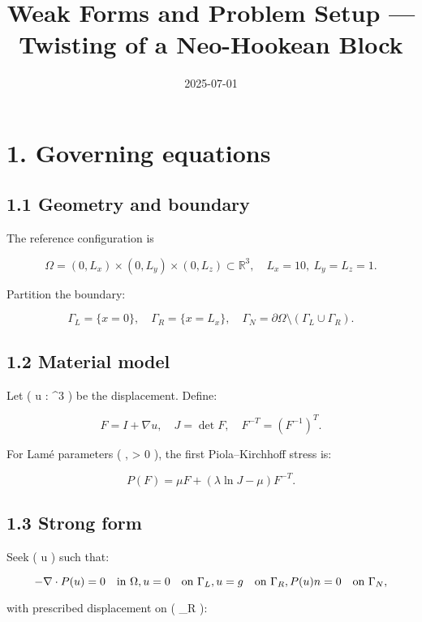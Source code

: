 \documentclass[
  letterpaper,
  DIV=11,
  numbers=noendperiod]{scrartcl}
\title{Weak Forms and Problem Setup --- Twisting of a Neo-Hookean Block}
\author{}
\date{2025-07-01}
\begin{document}
\maketitle


\section{1. Governing equations}\label{governing-equations}

\subsection{1.1 Geometry and boundary}\label{geometry-and-boundary}

The reference configuration is

\[
\Omega = (0, L_x) \times (0, L_y) \times (0, L_z) \subset \mathbb{R}^3, \quad L_x = 10,\ L_y = L_z = 1.
\]

Partition the boundary:

\[
\Gamma_L = \{ x = 0 \}, \quad \Gamma_R = \{ x = L_x \}, \quad \Gamma_N = \partial \Omega \setminus (\Gamma_L \cup \Gamma_R).
\]

\subsection{1.2 Material model}\label{material-model}

Let ( u : \Omega \to {}\^{}3 ) be the displacement. Define:

\[
F = I + \nabla u, \quad J = \det F, \quad F^{-T} = (F^{-1})^T.
\]

For Lamé parameters ( \mu, \lambda \textgreater{} 0 ), the first
Piola--Kirchhoff stress is:

\[
P(F) = \mu F + (\lambda \ln J - \mu) F^{-T}.
\]

\subsection{1.3 Strong form}\label{strong-form}

Seek ( u ) such that:

\[
-\nabla \cdot P(u) = 0 \quad \text{in } \Omega, \\
u = 0 \quad \text{on } \Gamma_L, \\
u = g \quad \text{on } \Gamma_R, \\
P(u)n = 0 \quad \text{on } \Gamma_N,
\]

with prescribed displacement on ( \Gamma\_R ):
\end{document}
